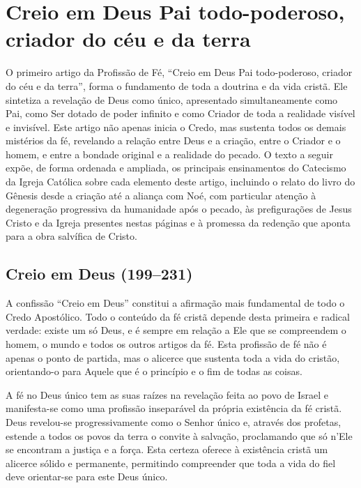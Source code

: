 \chapter{Creio em Deus Pai todo-poderoso, criador do céu e da terra}

O primeiro artigo da Profissão de Fé, ``Creio em Deus Pai todo-poderoso, criador do céu e da terra'', forma o fundamento de toda a doutrina e da vida cristã. Ele sintetiza a revelação de Deus como único, apresentado simultaneamente como Pai, como Ser dotado de poder infinito e como Criador de toda a realidade visível e invisível. Este artigo não apenas inicia o Credo, mas sustenta todos os demais mistérios da fé, revelando a relação entre Deus e a criação, entre o Criador e o homem, e entre a bondade original e a realidade do pecado. O texto a seguir expõe, de forma ordenada e ampliada, os principais ensinamentos do Catecismo da Igreja Católica sobre cada elemento deste artigo, incluindo o relato do livro do Gênesis desde a criação até a aliança com Noé, com particular atenção à degeneração progressiva da humanidade após o pecado, às prefigurações de Jesus Cristo e da Igreja presentes nestas páginas e à promessa da redenção que aponta para a obra salvífica de Cristo.

\section{Creio em Deus (199--231)}

A confissão ``Creio em Deus'' constitui a afirmação mais fundamental de todo o Credo Apostólico. Todo o conteúdo da fé cristã depende desta primeira e radical verdade: existe um só Deus, e é sempre em relação a Ele que se compreendem o homem, o mundo e todos os outros artigos da fé. Esta profissão de fé não é apenas o ponto de partida, mas o alicerce que sustenta toda a vida do cristão, orientando-o para Aquele que é o princípio e o fim de todas as coisas.

A fé no Deus único tem as suas raízes na revelação feita ao povo de Israel e manifesta-se como uma profissão inseparável da própria existência da fé cristã. Deus revelou-se progressivamente como o Senhor único e, através dos profetas, estende a todos os povos da terra o convite à salvação, proclamando que só n’Ele se encontram a justiça e a força. Esta certeza oferece à existência cristã um alicerce sólido e permanente, permitindo compreender que toda a vida do fiel deve orientar-se para este Deus único.

